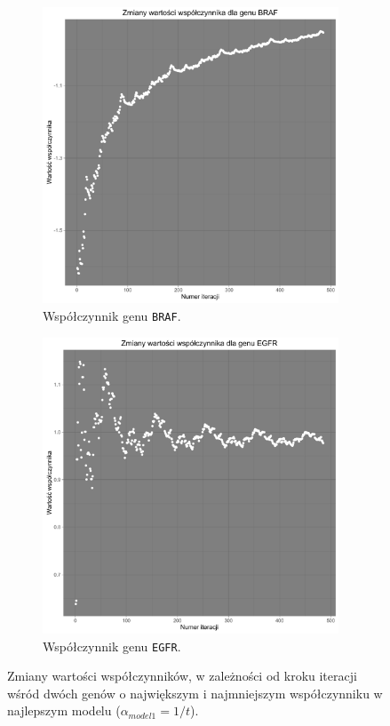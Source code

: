\begin{figure}[hbt!]
  \begin{center}
   \begin{subfigure}[h!]{0.45\textwidth}
      \includegraphics[width=\textwidth, height=250pt]{Obrazki/analiza/BRAF.pdf}
      \caption{Współczynnik genu \texttt{BRAF}.}
   \end{subfigure}     
   \begin{subfigure}[h!]{0.45\textwidth}
      \includegraphics[width=\textwidth, height=250pt]{Obrazki/analiza/EGFR.pdf}
            \caption{Współczynnik genu \texttt{EGFR}.}
   \end{subfigure}  
      \end{center}
  \caption{\label{trajAnalisis} Zmiany wartości współczynników, w zależności od kroku iteracji wśród dwóch genów o największym i najmniejszym współczynniku w najlepszym modelu ($\alpha_{model1} = 1/t$).}
\end{figure}




